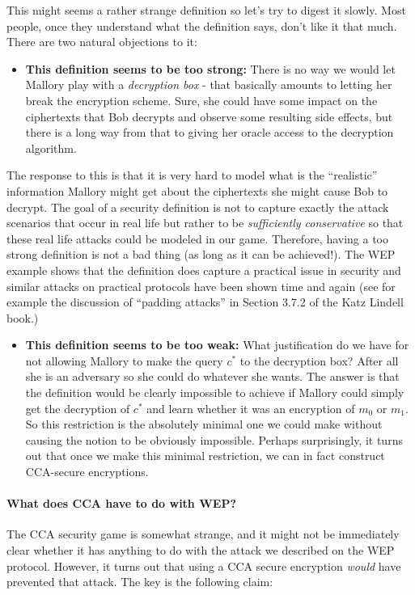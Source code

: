 This might seems a rather strange definition so let's try to digest it
slowly. Most people, once they understand what the definition says,
don't like it that much. There are two natural objections to it:

\begin{itemize}
\tightlist
\item
  \textbf{This definition seems to be too strong:} There is no way we
  would let Mallory play with a \emph{decryption box} - that basically
  amounts to letting her break the encryption scheme. Sure, she could
  have some impact on the ciphertexts that Bob decrypts and observe some
  resulting side effects, but there is a long way from that to giving
  her oracle access to the decryption algorithm.
\end{itemize}

The response to this is that it is very hard to model what is the
``realistic'' information Mallory might get about the ciphertexts she
might cause Bob to decrypt. The goal of a security definition is not to
capture exactly the attack scenarios that occur in real life but rather
to be \emph{sufficiently conservative} so that these real life attacks
could be modeled in our game. Therefore, having a too strong definition
is not a bad thing (as long as it can be achieved!). The WEP example
shows that the definition does capture a practical issue in security and
similar attacks on practical protocols have been shown time and again
(see for example the discussion of ``padding attacks'' in Section 3.7.2
of the Katz Lindell book.)

\begin{itemize}
\tightlist
\item
  \textbf{This definition seems to be too weak:} What justification do
  we have for not allowing Mallory to make the query \(c^*\) to the
  decryption box? After all she is an adversary so she could do whatever
  she wants. The answer is that the definition would be clearly
  impossible to achieve if Mallory could simply get the decryption of
  \(c^*\) and learn whether it was an encryption of \(m_0\) or \(m_1\).
  So this restriction is the absolutely minimal one we could make
  without causing the notion to be obviously impossible. Perhaps
  surprisingly, it turns out that once we make this minimal restriction,
  we can in fact construct CCA-secure encryptions.
\end{itemize}

\paragraph{What does CCA have to do with WEP?} The CCA security game is
somewhat strange, and it might not be immediately clear whether it has
anything to do with the attack we described on the WEP protocol.
However, it turns out that using a CCA secure encryption \emph{would}
have prevented that attack. The key is the following claim:

